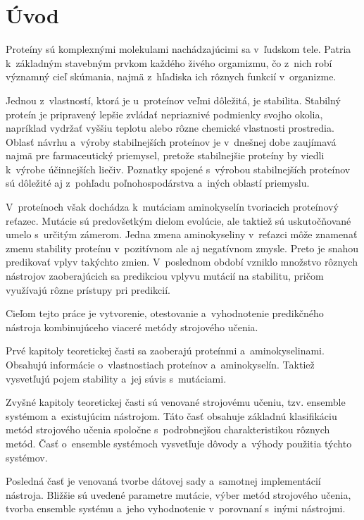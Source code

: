
\chapter{Úvod}

Proteíny sú komplexnými molekulami nachádzajúcimi sa v~ľudskom tele. Patria k~základným stavebným prvkom každého živého orgamizmu, čo z~nich robí významný cieľ skúmania, najmä z~hľadiska ich rôznych funkcií v~organizme.

Jednou z~vlastností, ktorá je u~proteínov veľmi dôležitá, je stabilita. Stabilný proteín je pripravený lepšie zvládať nepriaznivé podmienky svojho okolia, napríklad vydržať vyššiu teplotu alebo rôzne chemické vlastnosti prostredia. Oblasť návrhu a~výroby stabilnejších proteínov je v~dnešnej dobe zaujímavá najmä pre farmaceutický priemysel, pretože stabilnejšie proteíny by viedli k~výrobe účinnejších liečiv. Poznatky spojené s~výrobou stabilnejších proteínov sú dôležité aj z~pohľadu poľnohospodárstva a~iných oblastí priemyslu.

V~proteínoch však dochádza k~mutáciam aminokyselín tvoriacich proteínový reťazec. Mutácie sú predovšetkým dielom evolúcie, ale taktiež sú uskutočňované umelo s~určitým zámerom. Jedna zmena aminokyseliny v~reťazci môže znamenať zmenu stability proteínu v~pozitívnom ale aj negatívnom zmysle. Preto je snahou predikovať vplyv takýchto zmien. 
V~poslednom období vzniklo množstvo rôznych nástrojov zaoberajúcich sa predikciou vplyvu mutácií na stabilitu, pričom využívajú rôzne prístupy pri predikcií.

Cieľom tejto práce je vytvorenie, otestovanie a~vyhodnotenie predikčného nástroja kombinujúceho viaceré metódy strojového učenia.

Prvé kapitoly teoretickej časti sa zaoberajú proteínmi a~aminokyselinami. Obsahujú informácie o~vlastnostiach proteínov a~aminokyselín. Taktiež vysvetľujú pojem stability a~jej súvis s~mutáciami.

Zvyšné kapitoly teoretickej časti sú venované strojovému učeniu, tzv. ensemble systémom a~existujúcim nástrojom. Táto časť obsahuje základnú klasifikáciu metód strojového učenia spoločne s~podrobnejšou charakteristikou rôznych metód. Časť o~ensemble systémoch vysvetľuje dôvody a~výhody použitia týchto systémov.

Posledná časť je venovaná tvorbe dátovej sady a~samotnej implementácií nástroja. Bližšie sú uvedené parametre mutácie, výber metód strojového učenia, tvorba ensemble systému a~jeho vyhodnotenie v~porovnaní s~inými nástrojmi.


